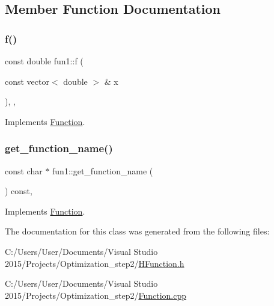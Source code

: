 \subsection{Member Function Documentation}
\mbox{\label{classfun1_afc5f6c5f842b59be98115c23864ccce5}} 
\subsubsection{\texorpdfstring{f()}{f()}}
{\footnotesize\ttfamily const double fun1\+::f (\begin{DoxyParamCaption}\item[{const vector$<$ double $>$ \&}]{x }\end{DoxyParamCaption})\hspace{0.3cm}{\ttfamily [inline]}, {\ttfamily [override]}, {\ttfamily [virtual]}}



Implements \hyperlink{class_function_ae700c7cb44bd2048d712466767be2803}{Function}.

\mbox{\label{classfun1_ad511ad7550fdfed650b5ded751f0f1e2}} 
\subsubsection{\texorpdfstring{get\+\_\+function\+\_\+name()}{get\_function\_name()}}
{\footnotesize\ttfamily const char $\ast$ fun1\+::get\+\_\+function\+\_\+name (\begin{DoxyParamCaption}{ }\end{DoxyParamCaption}) const\hspace{0.3cm}{\ttfamily [override]}, {\ttfamily [virtual]}}



Implements \hyperlink{class_function_a928c579622c47d98e91477ef18dec199}{Function}.



The documentation for this class was generated from the following files\+:\begin{DoxyCompactItemize}
\item 
C\+:/\+Users/\+User/\+Documents/\+Visual Studio 2015/\+Projects/\+Optimization\+\_\+step2/\hyperlink{_h_function_8h}{H\+Function.\+h}\item 
C\+:/\+Users/\+User/\+Documents/\+Visual Studio 2015/\+Projects/\+Optimization\+\_\+step2/\hyperlink{_function_8cpp}{Function.\+cpp}\end{DoxyCompactItemize}
